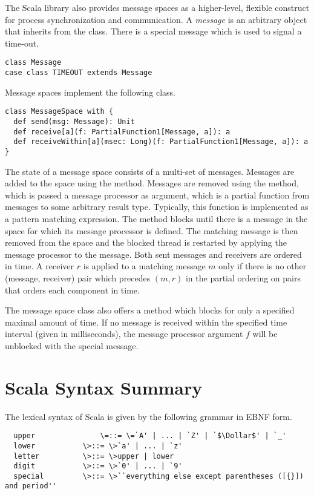 \documentclass[11pt]{report}
\begin{document}
\begin{itemize}
The Scala library also provides message spaces as a higher-level,
flexible construct for process synchronization and communication. A
{\em message} is an arbitrary object that inherits from the
\verb@Message@ class.
There is a special message \verb@TIMEOUT@ which is used to signal a time-out.
\begin{verbatim}
class Message
case class TIMEOUT extends Message
\end{verbatim}
Message spaces implement the following class.
\begin{verbatim}
class MessageSpace with {
  def send(msg: Message): Unit
  def receive[a](f: PartialFunction1[Message, a]): a
  def receiveWithin[a](msec: Long)(f: PartialFunction1[Message, a]): a
}
\end{verbatim}
The state of a message space consists of a multi-set of messages.
Messages are added to the space using the \verb@send@ method. Messages
are removed using the \verb@receive@ method, which is passed a message
processor \verb@f@ as argument, which is a partial function from
messages to some arbitrary result type. Typically, this function is
implemented as a pattern matching expression. The \verb@receive@
method blocks until there is a message in the space for which its
message processor is defined.  The matching message is then removed
from the space and the blocked thread is restarted by applying the
message processor to the message. Both sent messages and receivers are
ordered in time. A receiver $r$ is applied to a matching message $m$
only if there is no other (message, receiver) pair which precedes $(m,
r)$ in the partial ordering on pairs that orders each component in
time.

The message space class also offers a method \verb@receiveWithin@
which blocks for only a specified maximal amount of time.  If no
message is received within the specified time interval (given in
milliseconds), the message processor argument $f$ will be unblocked
with the special \verb@TIMEOUT@ message.

\appendix
\chapter{Scala Syntax Summary}

The lexical syntax of Scala is given by the following grammar in EBNF
form.

\begin{verbatim}
  upper               \=::= \=`A' | ... | `Z' | `$\Dollar$' | `_'
  lower           \>::= \>`a' | ... | `z'
  letter          \>::= \>upper | lower
  digit           \>::= \>`0' | ... | `9'
  special         \>::= \>``everything else except parentheses ([{}]) and period''


\end{verbatim}
\end{itemize}
\end{document}
